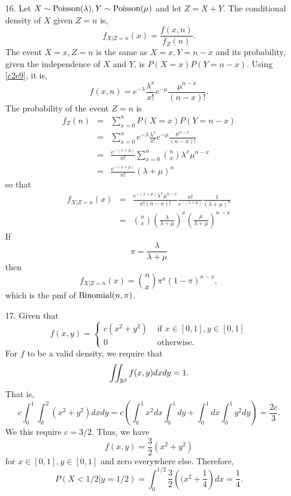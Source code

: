 \documentclass{article}
\begin{document}
\begin{enumerate}
\item[16.] Let $X \sim \text{Poisson}(\lambda), Y \sim \text{Poisson}(\mu)$ and let $Z = X + Y$. 
The conditional density of $X$ given $Z = n$ is,
\[
f_{X|Z=n}(x) = \frac{f(x, n)}{f_Z(n)}.
\]
The event $X = x, Z = n$ is the same as $X = x, Y = n - x$ and its probability,
given the independence of $X$ and $Y$, is $P(X=x)P(Y=n-x)$. Using \eqref{c2e9},
it is,
\[
f(x, n) = e^{-\lambda}\frac{\lambda^x}{x!} e^{-\mu}\frac{\mu^{n-x}}{(n-x)!}.
\]
The probability of the event $Z = n$ is
\begin{eqnarray*}
f_Z(n) &=& \sum_{x=0}^nP(X=x)P(Y=n-x) \\
 &=& \sum_{x=0}^n e^{-\lambda}\frac{\lambda^x}{x!} e^{-\mu}\frac{\mu^{n-x}}{(n-x)!} \\
 &=& \frac{e^{-(\lambda+\mu)}}{n!}\sum_{x=0}^n\binom{n}{x}\lambda^x\mu^{n-x} \\
 &=& \frac{e^{-(\lambda+\mu)}}{n!}(\lambda + \mu)^n
\end{eqnarray*}
so that
\begin{eqnarray*}
f_{X|Z=n}(x) &=& \frac{e^{-(\lambda+\mu)}\lambda^x\mu^{n-x}}{x!(n-x)!}
     \frac{n!}{e^{-(\lambda+\mu)}}\frac{1}{(\lambda + \mu)^n} \\
 &=& \binom{n}{x}\left(\frac{\lambda}{\lambda+\mu}\right)^x
     \left(\frac{\mu}{\lambda+\mu}\right)^{n-x}
\end{eqnarray*}
If 
\[
\pi = \frac{\lambda}{\lambda+\mu}
\]
then 
\[
f_{X|Z=n}(x) = \binom{n}{x}\pi^x(1 - \pi)^{n-x},
\]
which is the pmf of $\text{Binomial}(n, \pi)$.

\item[17.] Given that
\[
f(x, y) = \begin{cases}
c(x^2 + y^2) & \text{ if } x \in [0, 1], y \in [0, 1] \\
0 & \text{ otherwise.}
\end{cases}
\]
For $f$ to be a valid density, we require that
\[
\iint_{\mathbb{R}^2}f(x, y)dxdy = 1.
\]
That is,
\[
c\int_0^1\int_0^2 (x^2 + y^2)dxdy = c\left(\int_0^1x^2dx\int_0^1 dy + 
\int_0^1dx\int_0^1 y^2dy\right) = \frac{2c}{3}.
\]
We this require $c = 3/2$. Thus, we have 
\[
f(x, y) = \frac{3}{2}(x^2 + y^2)
\]
for $x \in [0, 1], y \in [0, 1]$ and zero everywhere else. Therefore,
\[
P(X < 1/2|y = 1/2) = \int_0^{1/2}\frac{3}{2}\left((x^2 + \frac{1}{4}\right)dx = 
\frac{1}{4}.
\]
\end{enumerate}
\end{document}
